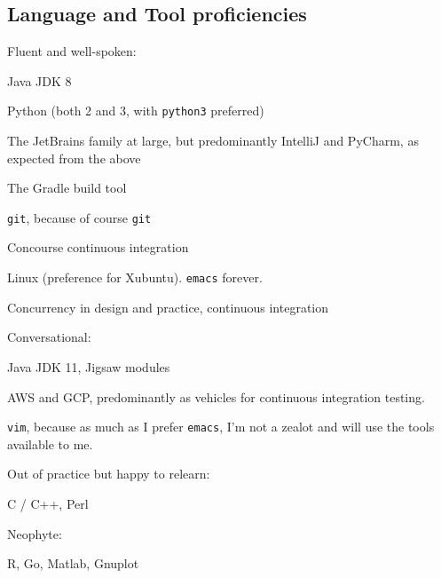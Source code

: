 \documentclass[10pt,letterpaper]{article}
\newcommand\ttt\texttt
\renewenvironment{itemize}{
  \begin{list}{}{
    \setlength{\leftmargin}{1.5em}
    \setlength{\itemsep}{0.25em}
    \setlength{\parskip}{0pt}
    \setlength{\parsep}{0.25em}
  }
}{
  \end{list}
}
\begin{document}
\subsection*{Language and Tool proficiencies}
\begin{itemize}
  \item Fluent and well-spoken:
  \begin{itemize}
    \item Java JDK 8
    \item Python (both 2 and 3, with \ttt{python3} preferred) %
    \item The JetBrains family at large, but predominantly IntelliJ and PyCharm, as expected from the above
    \item The Gradle build tool
    \item \ttt{git}, because of course \ttt{git}
    \item Concourse continuous integration
    \item Linux (preference for Xubuntu).  \ttt{emacs} forever.
    \item Concurrency in design and practice, continuous integration
  \end{itemize}
  \item Conversational:
  \begin{itemize}
    \item Java JDK 11, Jigsaw modules
    \item AWS and GCP, predominantly as vehicles for continuous integration testing.
    \item \ttt{vim}, because as much as I prefer \ttt{emacs}, I'm not a zealot and will use the tools available to me.
  \end{itemize}
  \item Out of practice but happy to relearn:
  \begin{itemize}
    \item C / C++, Perl
  \end{itemize}
  \item Neophyte:
  \begin{itemize}
    \item R, Go, Matlab, Gnuplot
  \end{itemize}
\end{itemize}
\end{document}
